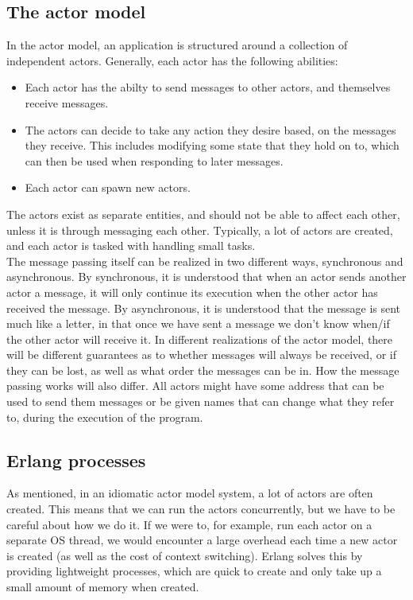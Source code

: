 \documentclass[a4paper]{article}
\begin{document}

\subsection{The actor model}
In the actor model, an application is structured around a collection of
independent actors. Generally, each actor has the following abilities:
\begin{itemize}
\item Each actor has the abilty to send messages to other actors, and
  themselves receive messages.
\item The actors can decide to take any action they desire based, on the messages
  they receive. This includes modifying some state that they hold on to, which
  can then be used when responding to later messages.
\item Each actor can spawn new actors.
\end{itemize}

\noindent
The actors exist as separate entities, and should not be able to affect each
other, unless it is through messaging each other. Typically, a lot of actors are
created, and each actor is tasked with handling small tasks.\\

\noindent
The message passing itself can be realized in two different ways, synchronous
and asynchronous. By synchronous, it is understood that when an actor sends
another actor a message, it will only continue its execution when the other
actor has received the message. By asynchronous, it is understood that the
message is sent much like a letter, in that once we have sent a message we don't
know when/if the other actor will receive it. In different realizations of the
actor model, there will be different guarantees as to whether messages will
always be received, or if they can be lost, as well as what order the messages
can be in. How the message passing works will also differ. All actors might have
some address that can be used to send them messages or be given names that can
change what they refer to, during the execution of the program.

\subsection{Erlang processes}
As mentioned, in an idiomatic actor model system, a lot of actors are often
created. This means that we can run the actors concurrently,
but we have to be careful about how we do it. If we were to, for example, run each actor on a
separate OS thread, we would encounter a large overhead each time a new actor
is created (as well as the cost of context switching). Erlang solves this by
providing lightweight processes, which are quick to create and only take up a
small amount of memory when created.\\
\end{document}
